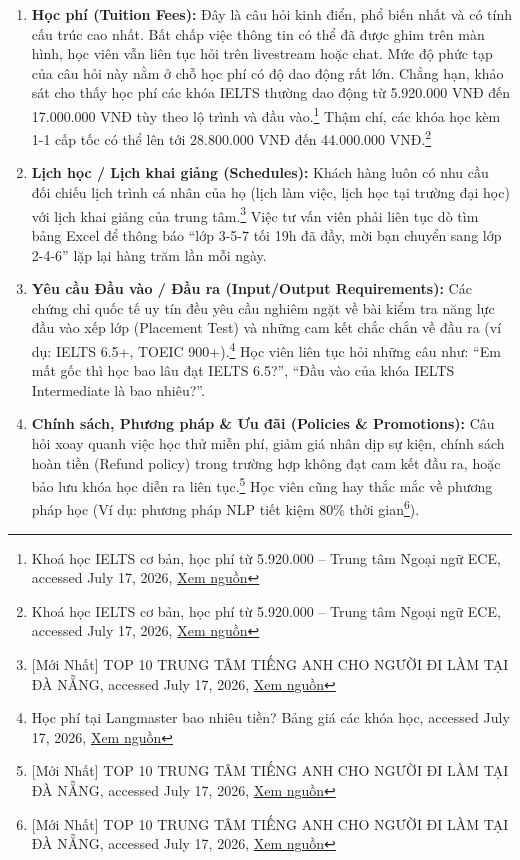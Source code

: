 \begin{enumerate}
    \item \textbf{Học phí (Tuition Fees):} Đây là câu hỏi kinh điển, phổ biến nhất và có tính cấu trúc cao nhất. Bất chấp việc thông tin có thể đã được ghim trên màn hình, học viên vẫn liên tục hỏi trên livestream hoặc chat. Mức độ phức tạp của câu hỏi này nằm ở chỗ học phí có độ dao động rất lớn. Chẳng hạn, khảo sát cho thấy học phí các khóa IELTS thường dao động từ 5.920.000 VNĐ đến 17.000.000 VNĐ tùy theo lộ trình và đầu vào.\footnote{Khoá học IELTS cơ bản, học phí từ 5.920.000 -- Trung tâm Ngoại ngữ ECE, accessed July 17, 2026, \href{https://ece.edu.vn/1-khoa-hoc-ielts-bao-nhieu-tien/}{Xem nguồn}} Thậm chí, các khóa học kèm 1-1 cấp tốc có thể lên tới 28.800.000 VNĐ đến 44.000.000 VNĐ.\footnote{Khoá học IELTS cơ bản, học phí từ 5.920.000 -- Trung tâm Ngoại ngữ ECE, accessed July 17, 2026, \href{https://ece.edu.vn/1-khoa-hoc-ielts-bao-nhieu-tien/}{Xem nguồn}}

    \item \textbf{Lịch học / Lịch khai giảng (Schedules):} Khách hàng luôn có nhu cầu đối chiếu lịch trình cá nhân của họ (lịch làm việc, lịch học tại trường đại học) với lịch khai giảng của trung tâm.\footnote{[Mới Nhất] TOP 10 TRUNG TÂM TIẾNG ANH CHO NGƯỜI ĐI LÀM TẠI ĐÀ NẴNG, accessed July 17, 2026, \href{https://wiseenglish.edu.vn/trung-tam-tieng-anh-cho-nguoi-di-lam}{Xem nguồn}} Việc tư vấn viên phải liên tục dò tìm bảng Excel để thông báo ``lớp 3-5-7 tối 19h đã đầy, mời bạn chuyển sang lớp 2-4-6'' lặp lại hàng trăm lần mỗi ngày.

    \item \textbf{Yêu cầu Đầu vào / Đầu ra (Input/Output Requirements):} Các chứng chỉ quốc tế uy tín đều yêu cầu nghiêm ngặt về bài kiểm tra năng lực đầu vào xếp lớp (Placement Test) và những cam kết chắc chắn về đầu ra (ví dụ: IELTS 6.5+, TOEIC 900+).\footnote{Học phí tại Langmaster bao nhiêu tiền? Bảng giá các khóa học, accessed July 17, 2026, \href{https://langmaster.edu.vn/cap-nhat-moi-nhat-hoc-phi-langmaster-hien-nay-co-gia-bao-nhieu}{Xem nguồn}} Học viên liên tục hỏi những câu như: ``Em mất gốc thì học bao lâu đạt IELTS 6.5?'', ``Đầu vào của khóa IELTS Intermediate là bao nhiêu?''.

    \item \textbf{Chính sách, Phương pháp \& Ưu đãi (Policies \& Promotions):} Câu hỏi xoay quanh việc học thử miễn phí, giảm giá nhân dịp sự kiện, chính sách hoàn tiền (Refund policy) trong trường hợp không đạt cam kết đầu ra, hoặc bảo lưu khóa học diễn ra liên tục.\footnote{[Mới Nhất] TOP 10 TRUNG TÂM TIẾNG ANH CHO NGƯỜI ĐI LÀM TẠI ĐÀ NẴNG, accessed July 17, 2026, \href{https://wiseenglish.edu.vn/trung-tam-tieng-anh-cho-nguoi-di-lam}{Xem nguồn}} Học viên cũng hay thắc mắc về phương pháp học (Ví dụ: phương pháp NLP tiết kiệm 80\% thời gian\footnote{[Mới Nhất] TOP 10 TRUNG TÂM TIẾNG ANH CHO NGƯỜI ĐI LÀM TẠI ĐÀ NẴNG, accessed July 17, 2026, \href{https://wiseenglish.edu.vn/trung-tam-tieng-anh-cho-nguoi-di-lam}{Xem nguồn}}).
\end{enumerate}

